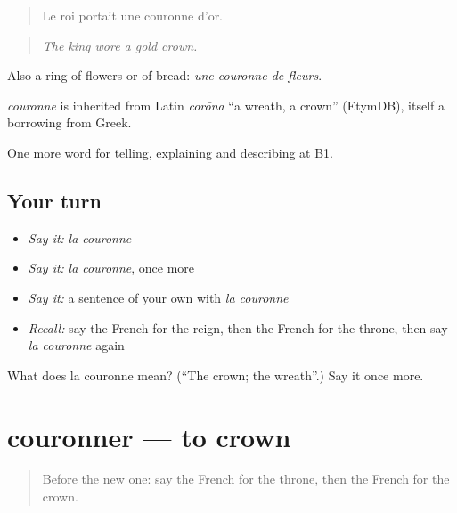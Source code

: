\begin{quote}
Le roi portait une couronne d'or.
\end{quote}

\begin{quote}
\emph{The king wore a gold crown.}
\end{quote}

Also a ring of flowers or of bread: \emph{une couronne de fleurs}.

\begin{cousinweb}
\emph{couronne} is inherited from Latin \emph{corōna} \textquotedblleft{}a wreath, a crown\textquotedblright{} (EtymDB), itself a borrowing from Greek.
\end{cousinweb}

\begin{grammarlens}[title={What you've built}]
One more word for telling, explaining and describing at B1.
\end{grammarlens}

\subsection*{Your turn}
\begin{itemize}
\raggedright
  \item \emph{Say it:} \emph{la couronne}
  \item \emph{Say it:} \emph{la couronne}, once more
  \item \emph{Say it:} a sentence of your own with \emph{la couronne}
  \item \emph{Recall:} say the French for the reign, then the French for the throne, then say \emph{la couronne} again
\end{itemize}

\begin{tcolorbox}[breakable,colback=teal!4,colframe=teal!35!black,title={Before you move on}]
What does la couronne mean? (\textquotedblleft{}The crown; the wreath\textquotedblright{}.) Say it once more.
\end{tcolorbox}
\section[couronner]{couronner — to crown}

\label{lesson:FR-C323-couronner}



\begin{quote}
Before the new one: say the French for the throne, then the French for the crown.
\end{quote}

